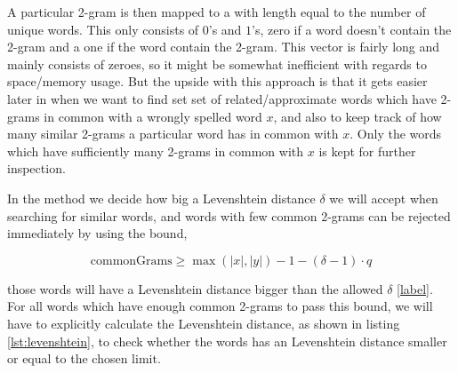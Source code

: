 A particular 2-gram is then mapped to a  with length equal to the number of unique words. This  only consists of \(0\)'s and \(1\)'s, zero if a word doesn't contain the 2-gram and a one if the word contain the 2-gram.
This vector is fairly long and mainly consists of zeroes, so it might be somewhat inefficient with regards to space/memory usage. 
But the upside with this approach is that it gets easier later in  when we want to find set set of related/approximate words which have 2-grams in common with a wrongly spelled word \(x\), and also to keep track of how many similar 2-grams a particular word has in common with \(x\). Only the words which have sufficiently many 2-grams in common with \(x\) is kept for further inspection. 

In the  method we decide how big a Levenshtein distance \(\delta\) we will accept when searching for similar words, and words with few common 2-grams can be rejected immediately by using the bound,

\[ \text{commonGrams} \geq \max{(|x|, |y|) - 1 - (\delta -1 ) \cdot q } \]   

those words will have a Levenshtein distance bigger than the allowed \(\delta\) \ref{label}.  
For all words which have enough common 2-grams to pass this bound, we will have to explicitly calculate the Levenshtein distance, as shown in listing \ref{lst:levenshtein}, to check whether the words has an Levenshtein distance smaller or equal to the chosen limit. 



